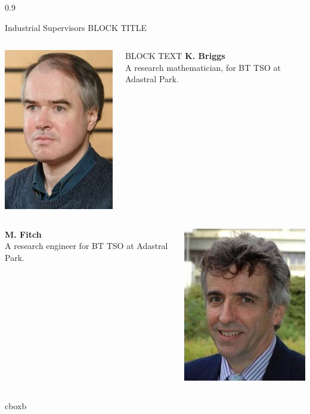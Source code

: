 \documentclass[final]{beamer}
\theoremstyle{plain}
\theoremstyle{definition}
\theoremstyle{remark}
\newlength{\onecolwid}
\begin{document}
\begin{frame}[t]
\begin{columns}[t]
\begin{column}{0.9\onecolwid}
\begin{alertblock}{Industrial Supervisors BLOCK TITLE}
\begin{columns}
\begin{column}{0.24\linewidth}
\includegraphics[scale=0.7]{KBriggs.jpg}
\end{column}
\begin{column}{0.74\linewidth}
BLOCK TEXT
\textbf{K. Briggs}
 \\
A research mathematician, for BT TSO at Adastral Park. \\
\end{column}
\end{columns}
\begin{columns}
\begin{column}{0.6\linewidth}
\textbf{M. Fitch}
 \\
A research engineer for BT TSO at Adastral Park. \\
\end{column}
\begin{column}{0.24\linewidth}
\includegraphics[scale=0.75]{MFitch.jpg}
\end{column}
\end{columns}
\end{alertblock}
 \hspace{0.5in}
 \begin{beamercolorbox}[wd=9in,colsep=0.15cm]{cboxb}
 \end{beamercolorbox}
 \vspace{0.1in}




\end{column}
\end{columns}
\end{frame}
\end{document}
